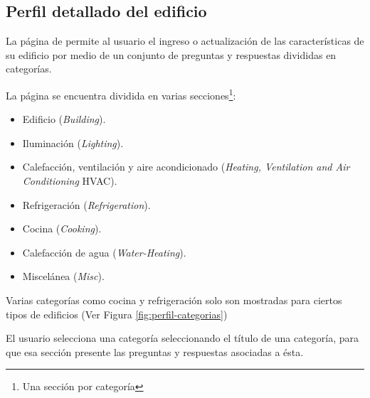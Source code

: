 \subsection{Perfil detallado del edificio}

La página de  permite al usuario el ingreso
o actualización de las características de su edificio por medio de un
conjunto de preguntas y respuestas divididas en categorías.

La página se encuentra dividida en varias secciones\footnote{Una sección por
  categoría}:
\begin{itemize}
\item Edificio (\textit{Building}).
\item Iluminación (\textit{Lighting}).
\item Calefacción, ventilación y aire acondicionado (\textit{Heating, Ventilation and Air Conditioning} HVAC).
\item Refrigeración (\textit{Refrigeration}).
\item Cocina (\textit{Cooking}).
\item Calefacción de agua (\textit{Water-Heating}).
\item Miscelánea (\textit{Misc}).
\end{itemize}

Varias categorías como cocina y refrigeración solo son mostradas
para ciertos tipos de edificios (Ver Figura \ref{fig:perfil-categorias})


El usuario selecciona una categoría seleccionando el título de una categoría,
para que esa sección presente las preguntas y respuestas asociadas a ésta.


